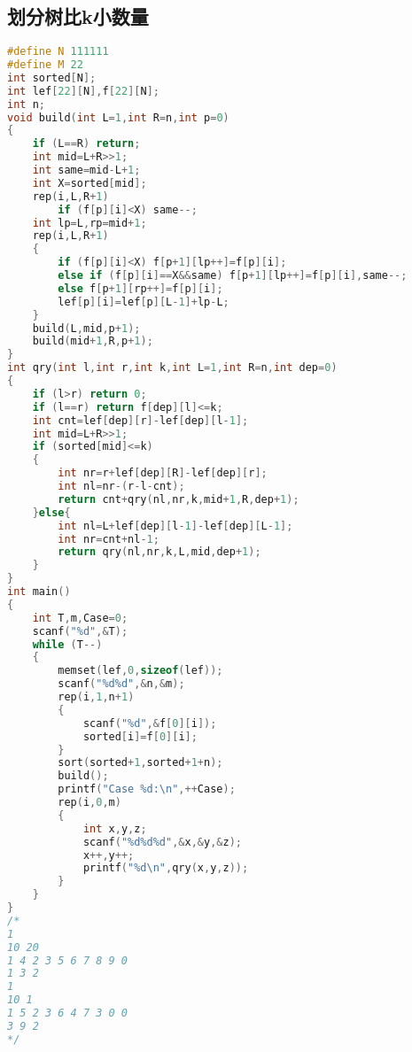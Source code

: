 \subsection{划分树比k小数量}
\begin{lstlisting}[language=C++]
#define N 111111
#define M 22
int sorted[N];
int lef[22][N],f[22][N];
int n;
void build(int L=1,int R=n,int p=0)
{
    if (L==R) return;
    int mid=L+R>>1;
    int same=mid-L+1;
    int X=sorted[mid];
    rep(i,L,R+1)
        if (f[p][i]<X) same--;
    int lp=L,rp=mid+1;
    rep(i,L,R+1)
    {
        if (f[p][i]<X) f[p+1][lp++]=f[p][i];
        else if (f[p][i]==X&&same) f[p+1][lp++]=f[p][i],same--;
        else f[p+1][rp++]=f[p][i];
        lef[p][i]=lef[p][L-1]+lp-L;
    }
    build(L,mid,p+1);
    build(mid+1,R,p+1);
}
int qry(int l,int r,int k,int L=1,int R=n,int dep=0)
{
    if (l>r) return 0;
    if (l==r) return f[dep][l]<=k;
    int cnt=lef[dep][r]-lef[dep][l-1];
    int mid=L+R>>1;
    if (sorted[mid]<=k)
    {
        int nr=r+lef[dep][R]-lef[dep][r];
        int nl=nr-(r-l-cnt);
        return cnt+qry(nl,nr,k,mid+1,R,dep+1);
    }else{
        int nl=L+lef[dep][l-1]-lef[dep][L-1];
        int nr=cnt+nl-1;
        return qry(nl,nr,k,L,mid,dep+1);
    }
}
int main()
{
    int T,m,Case=0;
    scanf("%d",&T);
    while (T--)
    {
        memset(lef,0,sizeof(lef));
        scanf("%d%d",&n,&m);
        rep(i,1,n+1)
        {
            scanf("%d",&f[0][i]);
            sorted[i]=f[0][i];
        }
        sort(sorted+1,sorted+1+n);
        build();
        printf("Case %d:\n",++Case);
        rep(i,0,m)
        {
            int x,y,z;
            scanf("%d%d%d",&x,&y,&z);
            x++,y++;
            printf("%d\n",qry(x,y,z));
        }
    }
}
/*
1 
10 20
1 4 2 3 5 6 7 8 9 0 
1 3 2 
1
10 1
1 5 2 3 6 4 7 3 0 0
3 9 2
*/
\end{lstlisting}
